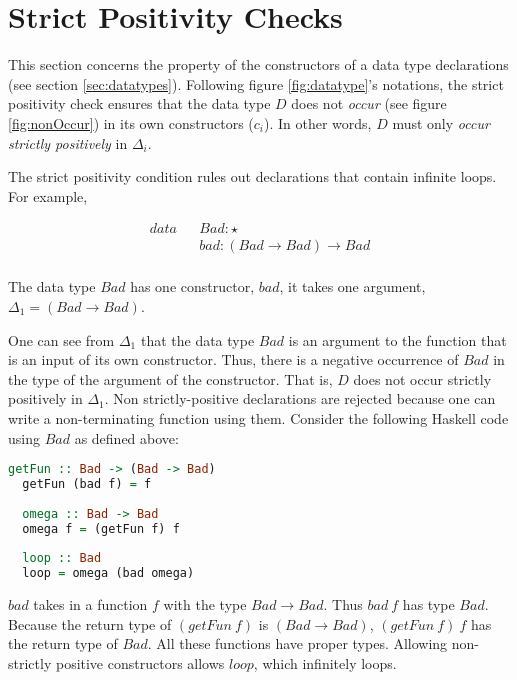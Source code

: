 \section{Strict Positivity Checks}
\label{sec:spos}

This section concerns the property of the constructors of a data type declarations (see section \ref{sec:datatypes}). Following figure \ref{fig:datatype}'s notations, the strict positivity check ensures that the data type $D$ does not \emph{occur} (see figure \ref{fig:nonOccur}) in its own constructors ($c_i$). In other words, $D$ must only \emph{occur strictly positively} in $\Delta_i$.

The strict positivity condition rules out declarations that contain infinite loops. For example,

\begin{equation*}
  \begin{aligned}
    data &  & Bad : \star                 \\
         &  & bad : (Bad \to Bad) \to Bad \\
  \end{aligned}
\end{equation*}

The data type $Bad$ has one constructor, $bad$, it takes one argument, $\Delta_1 = (Bad \to Bad)$.

One can see from $\Delta_1$ that the data type $Bad$ is an argument to the function that is an input of its own constructor. Thus, there is a negative occurrence of $Bad$ in the type of the argument of the constructor. That is, $D$ does not occur strictly positively in $\Delta_1$. Non strictly-positive declarations are rejected because one can write a non-terminating function using them. Consider the following Haskell code using $Bad$ as defined above:

\begin{lstlisting}[language=haskell]
  getFun :: Bad -> (Bad -> Bad)
  getFun (bad f) = f
  
  omega :: Bad -> Bad
  omega f = (getFun f) f
  
  loop :: Bad
  loop = omega (bad omega)
\end{lstlisting}

$bad$ takes in a function $f$ with the type $Bad \to Bad$. Thus $bad \: f$ has type $Bad$. Because the return type of $(getFun \: f)$ is $(Bad \to Bad)$, $(getFun \: f) \: f$ has the return type of $Bad$. All these functions have proper types. Allowing non-strictly positive constructors allows $loop$, which infinitely loops.

